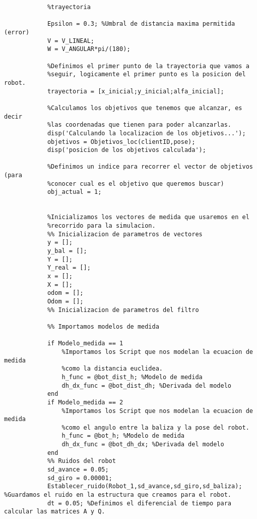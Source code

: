 \begin{lstlisting}[frame=single]
            %Definimos los parametros que nos ayudaran a calcular la
            %trayectoria

            Epsilon = 0.3; %Umbral de distancia maxima permitida (error)
            V = V_LINEAL;
            W = V_ANGULAR*pi/(180);

            %Definimos el primer punto de la trayectoria que vamos a
            %seguir, logicamente el primer punto es la posicion del robot.
            trayectoria = [x_inicial;y_inicial;alfa_inicial];

            %Calculamos los objetivos que tenemos que alcanzar, es decir
            %las coordenadas que tienen para poder alcanzarlas.
            disp('Calculando la localizacion de los objetivos...');
            objetivos = Objetivos_loc(clientID,pose);
            disp('posicion de los objetivos calculada');

            %Definimos un indice para recorrer el vector de objetivos (para
            %conocer cual es el objetivo que queremos buscar)
            obj_actual = 1;
            

            %Inicializamos los vectores de medida que usaremos en el
            %recorrido para la simulacion.
            %% Inicializacion de parametros de vectores
            y = [];
            y_bal = [];
            Y = [];
            Y_real = [];
            x = [];
            X = [];
            odom = [];
            Odom = [];
            %% Inicializacion de parametros del filtro
            
            %% Importamos modelos de medida
            
            if Modelo_medida == 1
                %Importamos los Script que nos modelan la ecuacion de medida
                %como la distancia euclidea.
                h_func = @bot_dist_h; %Modelo de medida
                dh_dx_func = @bot_dist_dh; %Derivada del modelo
            end
            if Modelo_medida == 2 
                %Importamos los Script que nos modelan la ecuacion de medida
                %como el angulo entre la baliza y la pose del robot.
                h_func = @bot_h; %Modelo de medida
                dh_dx_func = @bot_dh_dx; %Derivada del modelo
            end  
            %% Ruidos del robot
            sd_avance = 0.05;
            sd_giro = 0.00001;
            Establecer_ruido(Robot_1,sd_avance,sd_giro,sd_baliza); %Guardamos el ruido en la estructura que creamos para el robot.
            dt = 0.05; %Definimos el diferencial de tiempo para calcular las matrices A y Q.


\end{lstlisting}
